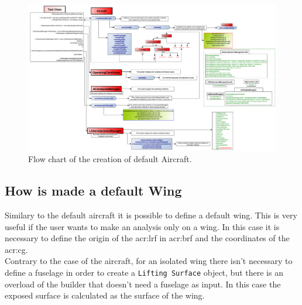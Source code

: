 \begin{figure}

\centering
\includegraphics[width=24.6cm]{immagini/HowToCreateADefaultAircraftInJPAD3.pdf}
\caption{Flow chart of the creation of default Aircraft.}
\label{fig:schemauno}

\end{figure}

\subsection {How is made a default Wing}
Similary to the default aircraft it is possible to define a default wing. This is very useful if the user wants to make an analysis only on a wing. In this case it is necessary to define the origin of the \gls{acr:lrf} in \gls{acr:brf}
and the coordinates of the \gls{acr:cg}.\\
Contrary to the case of the aircraft, for an isolated wing there isn't necessary to define a fuselage in order to create a \texttt{Lifting Surface} object, but there is an overload of the builder that doesn't need a fuselage as input. In this case the exposed surface is calculated as the surface of the wing.

